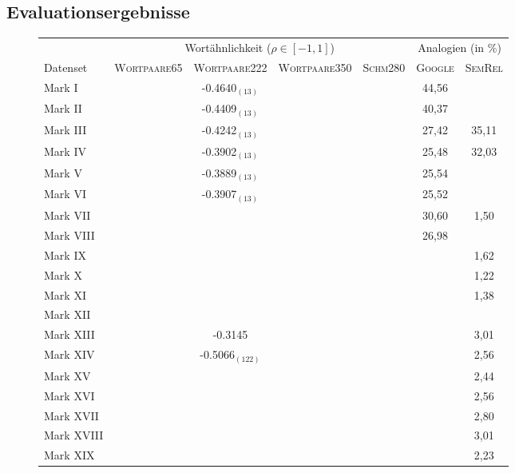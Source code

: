   \subsection{Evaluationsergebnisse}

  \newpage
  \begin{landscape}
  \begin{figure}[h]
    \centering
    \begin{tabular}{l||c|c|c|c||c|c}
       & \multicolumn{4}{c}{Wortähnlichkeit ($\rho \in [-1, 1]$)} & \multicolumn{2}{c}{Analogien (in \%)} \\
      Datenset & \textsc{Wortpaare65} & \textsc{Wortpaare222} & \textsc{Wortpaare350} & \textsc{Schm280} & \textsc{Google} & \textsc{SemRel} \\
      \hline \hline
      Mark I & & -0.4640$_{(13)}$& & & 44,56 & \\
      \hline
      Mark II &  & -0.4409$_{(13)}$ & & & 40,37 &  \\
      \hline
      Mark III &  & -0.4242$_{(13)}$ & & & 27,42 & 35,11 \\
      \hline
      Mark IV & & -0.3902$_{(13)}$ & & & 25,48 & 32,03 \\
      \hline
      Mark V &  & -0.3889$_{(13)}$ & & & 25,54 &  \\
      \hline
      Mark VI &  & -0.3907$_{(13)}$ & & & 25,52 &  \\
      \hline
      Mark VII &  &  & & & 30,60 & 1,50  \\
      \hline
      Mark VIII &  &  & & & 26,98 &  \\
      \hline
      Mark IX & & & & & & 1,62 \\
      \hline
      Mark X &  & & & & & 1,22 \\
      \hline
      Mark XI &  &  & & & & 1,38  \\
      \hline
      Mark XII &  &  & & & &  \\
      \hline
      Mark XIII &  & -0.3145 & & & & 3,01 \\
      \hline
      Mark XIV &  & -0.5066$_{(122)}$ & & & & 2,56 \\
      \hline
      Mark XV & &  & & & & 2,44 \\
      \hline
      Mark XVI &  & & & & & 2,56 \\
      \hline
      Mark XVII &  & & & & & 2,80 \\
      \hline
      Mark XVIII &  & & & & & 3,01 \\
      \hline
      Mark XIX &  & & & & & 2,23 \\

\end{tabular}
\end{figure}
\end{landscape}
